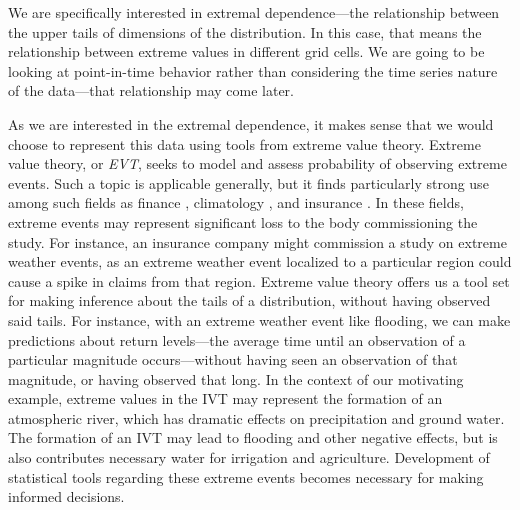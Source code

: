 We are specifically interested in extremal dependence---the relationship between the upper tails of
  dimensions of the distribution.  In this case, that means the relationship between extreme values
  in different grid cells.  We are going to be looking at point-in-time behavior rather than
  considering the time series nature of the data---that relationship may come later.

As we are interested in the extremal dependence, it makes sense that we would choose to represent
  this data using tools from extreme value theory.  Extreme value theory, or \emph{EVT}, seeks to
  model and assess probability of observing extreme events.  Such a topic is applicable generally,
  but it finds particularly strong use among such fields as finance \citep{allen2013},
  climatology \citep{trepanier2018}, and insurance \citep{beirlant1994}.  In these fields, extreme
  events may represent significant loss to the body commissioning the study.  For instance, an
  insurance company might commission a study on extreme weather events, as an extreme weather event
  localized to a particular region could cause a spike in claims from that region.  Extreme value
  theory offers us a tool set for making inference about the tails of a distribution, without having
  observed said tails.  For
  instance, with an extreme weather event like flooding, we can make predictions about return
  levels---the average time until an observation of a particular magnitude occurs---without having seen
  an observation of that magnitude, or having observed that long.  In the context of our motivating
  example, extreme values in the IVT may represent the formation of an atmospheric river, which has
  dramatic effects on precipitation and ground water.  The formation of an IVT may lead to flooding
  and other negative effects, but is also contributes necessary water for irrigation and agriculture.
  Development of statistical tools regarding these extreme events becomes necessary for making informed
  decisions.






